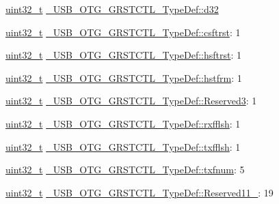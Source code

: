 \begin{DoxyCompactItemize}
\begin{tabbing}
\end{tabbing}\item 
\hyperlink{stdint_8h_a435d1572bf3f880d55459d9805097f62}{uint32\-\_\-t} \hyperlink{group___u_s_b___o_t_g___d_r_i_v_e_r_ga99aa54b3bf96dc62e5a6e2f0d02b15a0}{\-\_\-\-U\-S\-B\-\_\-\-O\-T\-G\-\_\-\-G\-R\-S\-T\-C\-T\-L\-\_\-\-Type\-Def\-::d32}
\item 
\hyperlink{stdint_8h_a435d1572bf3f880d55459d9805097f62}{uint32\-\_\-t} \hyperlink{group___u_s_b___o_t_g___d_r_i_v_e_r_gaff6144b9dc68f62487e3e19efcff1a20}{\-\_\-\-U\-S\-B\-\_\-\-O\-T\-G\-\_\-\-G\-R\-S\-T\-C\-T\-L\-\_\-\-Type\-Def\-::csftrst}\-: 1
\item 
\hyperlink{stdint_8h_a435d1572bf3f880d55459d9805097f62}{uint32\-\_\-t} \hyperlink{group___u_s_b___o_t_g___d_r_i_v_e_r_ga0ce950fb04d37c6bfb5ca18fc740b3d3}{\-\_\-\-U\-S\-B\-\_\-\-O\-T\-G\-\_\-\-G\-R\-S\-T\-C\-T\-L\-\_\-\-Type\-Def\-::hsftrst}\-: 1
\item 
\hyperlink{stdint_8h_a435d1572bf3f880d55459d9805097f62}{uint32\-\_\-t} \hyperlink{group___u_s_b___o_t_g___d_r_i_v_e_r_ga74ac2a67ad56bfb0d44539efa6dad5bc}{\-\_\-\-U\-S\-B\-\_\-\-O\-T\-G\-\_\-\-G\-R\-S\-T\-C\-T\-L\-\_\-\-Type\-Def\-::hstfrm}\-: 1
\item 
\hyperlink{stdint_8h_a435d1572bf3f880d55459d9805097f62}{uint32\-\_\-t} \hyperlink{group___u_s_b___o_t_g___d_r_i_v_e_r_ga3ddb35024f1d6b9df8699e9471afda72}{\-\_\-\-U\-S\-B\-\_\-\-O\-T\-G\-\_\-\-G\-R\-S\-T\-C\-T\-L\-\_\-\-Type\-Def\-::\-Reserved3}\-: 1
\item 
\hyperlink{stdint_8h_a435d1572bf3f880d55459d9805097f62}{uint32\-\_\-t} \hyperlink{group___u_s_b___o_t_g___d_r_i_v_e_r_ga1cc327f836fad208772495510703d944}{\-\_\-\-U\-S\-B\-\_\-\-O\-T\-G\-\_\-\-G\-R\-S\-T\-C\-T\-L\-\_\-\-Type\-Def\-::rxfflsh}\-: 1
\item 
\hyperlink{stdint_8h_a435d1572bf3f880d55459d9805097f62}{uint32\-\_\-t} \hyperlink{group___u_s_b___o_t_g___d_r_i_v_e_r_ga35e4fa074133fbed23d7c251825dc21f}{\-\_\-\-U\-S\-B\-\_\-\-O\-T\-G\-\_\-\-G\-R\-S\-T\-C\-T\-L\-\_\-\-Type\-Def\-::txfflsh}\-: 1
\item 
\hyperlink{stdint_8h_a435d1572bf3f880d55459d9805097f62}{uint32\-\_\-t} \hyperlink{group___u_s_b___o_t_g___d_r_i_v_e_r_gab95417d18c00e88b30adcc7641257683}{\-\_\-\-U\-S\-B\-\_\-\-O\-T\-G\-\_\-\-G\-R\-S\-T\-C\-T\-L\-\_\-\-Type\-Def\-::txfnum}\-: 5
\item 
\hyperlink{stdint_8h_a435d1572bf3f880d55459d9805097f62}{uint32\-\_\-t} \hyperlink{group___u_s_b___o_t_g___d_r_i_v_e_r_gabcbcfe6e19057b32ab213ff12a17af14}{\-\_\-\-U\-S\-B\-\_\-\-O\-T\-G\-\_\-\-G\-R\-S\-T\-C\-T\-L\-\_\-\-Type\-Def\-::\-Reserved11\-\_}\-: 19

\end{DoxyCompactItemize}
